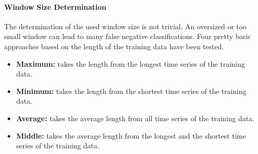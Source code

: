 \paragraph{Window Size Determination} \label{window_size_determination}
The determination of the used window size is not trivial. An oversized or too small window can lead to many false
negative classifications. Four pretty basic approaches based on the length of the training data have been tested.

\begin{itemize}
    \item \textbf{Maximum:} takes the length from the longest time series of the training data.
    \item \textbf{Minimum:} takes the length from the shortest time series of the training data.
    \item \textbf{Average:} takes the average length from all time series of the training data.
    \item \textbf{Middle:} takes the average length from the longest and the shortest time series of the training data.
\end{itemize}
